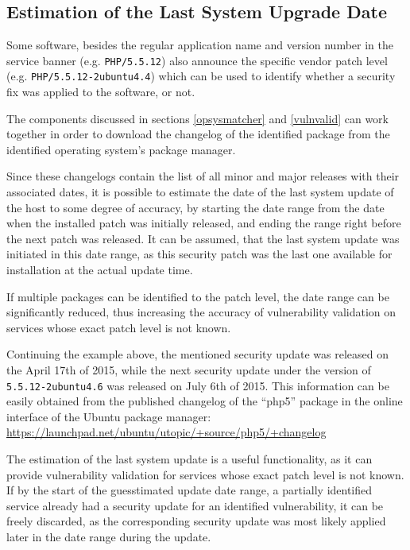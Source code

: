\documentclass[a4paper,12pt]{article}
\begin{document}
\subsection{Estimation of the Last System Upgrade Date}
 

	Some software, besides the regular application name and version number in the service banner (e.g. \texttt{PHP/5.5.12}) also announce the specific vendor patch level (e.g. \texttt{PHP/5.5.12-2ubuntu4.4}) which can be used to identify whether a security fix was applied to the software, or not.
	
	The components discussed in sections \ref{opsysmatcher} and \ref{vulnvalid} can work together in order to download the changelog of the identified package from the identified operating system's package manager.
	
	Since these changelogs contain the list of all minor and major releases with their associated dates, it is possible to estimate the date of the last system update of the host to some degree of accuracy, by starting the date range from the date when the installed patch was initially released, and ending the range right before the next patch was released. It can be assumed, that the last system update was initiated in this date range, as this security patch was the last one available for installation at the actual update time.
	
	If multiple packages can be identified to the patch level, the date range can be significantly reduced, thus increasing the accuracy of vulnerability validation on services whose exact patch level is not known.
	
	Continuing the example above, the mentioned security update was released on the April 17th of 2015, while the next security update under the version of \texttt{5.5.12-2ubuntu4.6} was released on July 6th of 2015. This information can be easily obtained from the published changelog of the ``php5'' package in the online interface of the Ubuntu package manager: \url{https://launchpad.net/ubuntu/utopic/+source/php5/+changelog}
	
	The estimation of the last system update is a useful functionality, as it can provide vulnerability validation for services whose exact patch level is not known. If by the start of the guesstimated update date range, a partially identified service already had a security update for an identified vulnerability, it can be freely discarded, as the corresponding security update was most likely applied later in the date range during the update.
	
\end{document}
